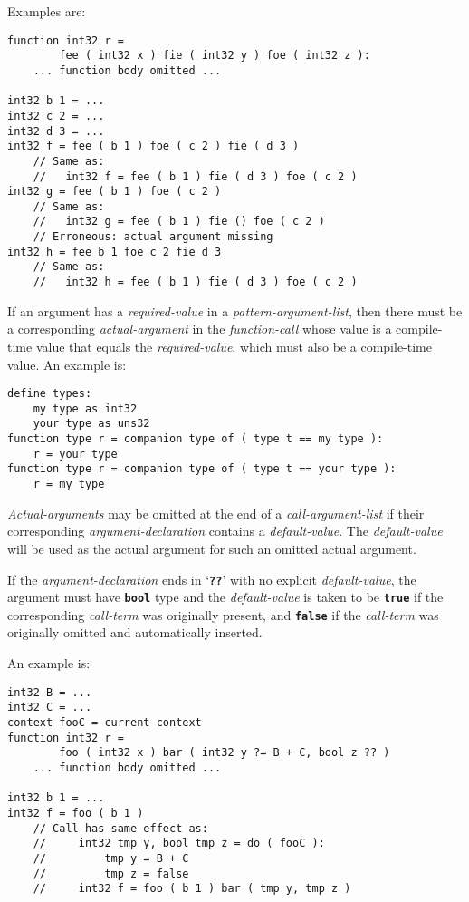 \documentclass[12pt]{article}
\newcommand{\TT}[1]{{\tt \bfseries #1}}
\newenvironment{indpar}[1][0.3in]%
	{\begin{list}{}%
		     {\setlength{\itemsep}{0in}%
		      \setlength{\topsep}{0in}%
		      \setlength{\parsep}{1ex}%
		      \setlength{\labelwidth}{#1}%
		      \setlength{\leftmargin}{#1}%
		      \addtolength{\leftmargin}{\labelsep}}%
	 \item}%
	{\end{list}}
\begin{document}
Examples are:
\begin{indpar}\begin{verbatim}
function int32 r =
        fee ( int32 x ) fie ( int32 y ) foe ( int32 z ):
    ... function body omitted ...

int32 b 1 = ...
int32 c 2 = ...
int32 d 3 = ...
int32 f = fee ( b 1 ) foe ( c 2 ) fie ( d 3 )
    // Same as:
    //   int32 f = fee ( b 1 ) fie ( d 3 ) foe ( c 2 )
int32 g = fee ( b 1 ) foe ( c 2 )
    // Same as:
    //   int32 g = fee ( b 1 ) fie () foe ( c 2 )
    // Erroneous: actual argument missing
int32 h = fee b 1 foe c 2 fie d 3
    // Same as:
    //   int32 h = fee ( b 1 ) fie ( d 3 ) foe ( c 2 )
\end{verbatim}\end{indpar}

If an argument has a {\em required-value} in a {\em pattern-argument-list},
then there must be a corresponding {\em actual-argument} in the
{\em function-call} whose value is a compile-time value that equals the
{\em required-value}, which must also be a compile-time value.  An example is:
\begin{indpar}\begin{verbatim}
define types:
    my type as int32
    your type as uns32
function type r = companion type of ( type t == my type ):
    r = your type
function type r = companion type of ( type t == your type ):
    r = my type
\end{verbatim}\end{indpar}

{\em Actual-arguments} may be omitted at the end of a {\em call-argument-list}
if their corresponding
{\em argu\-ment-declaration} contains a {\em default-value}.
The {\em default-value} will be used as the actual argument
for such an omitted actual argument.

If the {\em argument-declaration} ends in `\TT{??}'\label{BOOL-DEFAULT}
with no explicit {\em default-value}, the
argument must have \TT{bool} type and the
{\em default-value} is taken to be \TT{true} if the
corresponding {\em call-term} was originally present, and \TT{false} if the
{\em call-term} was originally omitted and automatically inserted.

An example is:
\begin{indpar}\begin{verbatim}
int32 B = ...
int32 C = ...
context fooC = current context
function int32 r =
        foo ( int32 x ) bar ( int32 y ?= B + C, bool z ?? )
    ... function body omitted ...

int32 b 1 = ...
int32 f = foo ( b 1 )
    // Call has same effect as:
    //     int32 tmp y, bool tmp z = do ( fooC ):
    //         tmp y = B + C
    //         tmp z = false
    //     int32 f = foo ( b 1 ) bar ( tmp y, tmp z )
\end{verbatim}\end{indpar}
\end{document}
